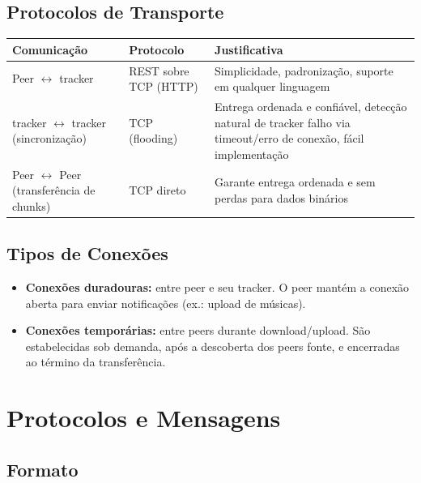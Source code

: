 \documentclass[12pt, a4paper]{article}
\begin{document}
\subsection{Protocolos de Transporte}

\begin{center}
\renewcommand{\arraystretch}{1.4} 

\begin{tabularx}{\textwidth}{
    l
    >{\raggedright\arraybackslash}X
    >{\raggedright\arraybackslash}X
}
\toprule
\textbf{Comunicação} & \textbf{Protocolo} & \textbf{Justificativa} \\
\midrule
Peer $\leftrightarrow$ tracker & REST sobre TCP (HTTP) & Simplicidade, padronização, suporte em qualquer linguagem \\
\addlinespace 
tracker $\leftrightarrow$ tracker (sincronização) & TCP (flooding) & Entrega ordenada e confiável, detecção natural de tracker falho via timeout/erro de conexão, fácil implementação \\
\addlinespace
Peer $\leftrightarrow$ Peer (transferência de chunks) & TCP direto & Garante entrega ordenada e sem perdas para dados binários \\
\bottomrule
\end{tabularx}
\end{center}

\subsection{Tipos de Conexões}

\begin{itemize}
    \item \textbf{Conexões duradouras:} entre peer e seu tracker. O peer mantém a conexão aberta para enviar notificações (ex.: upload de músicas).
    \item \textbf{Conexões temporárias:} entre peers durante download/upload. São estabelecidas sob demanda, após a descoberta dos peers fonte, e encerradas ao término da transferência.
\end{itemize}

\section{Protocolos e Mensagens}\label{sec:mensagens}
\subsection{Formato}
\end{document}
